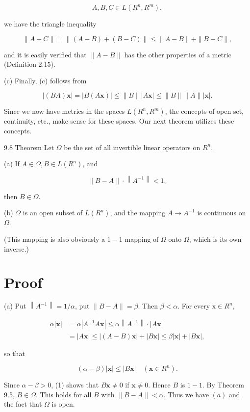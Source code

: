 \documentclass[10pt]{article}
\begin{document}
$$
A, B, C \in L\left(R^{n}, R^{m}\right),
$$

we have the triangle inequality

$$
\|A-C\|=\|(A-B)+(B-C)\| \leq\|A-B\|+\|B-C\|,
$$

and it is easily verified that $\|A-B\|$ has the other properties of a metric (Definition 2.15).

(c) Finally, (c) follows from

$$
|(B A) \mathbf{x}|=|B(A \mathbf{x})| \leq\|B\||A \mathbf{x}| \leq\|B\|\|A\||\mathbf{x}| .
$$

Since we now have metrics in the spaces $L\left(R^{n}, R^{m}\right)$, the concepts of open set, continuity, etc., make sense for these spaces. Our next theorem utilizes these concepts.

9.8 Theorem Let $\Omega$ be the set of all invertible linear operators on $R^{n}$.

(a) If $A \in \Omega, B \in L\left(R^{n}\right)$, and

$$
\|B-A\| \cdot\left\|A^{-1}\right\|<1,
$$

then $B \in \Omega$.

(b) $\Omega$ is an open subset of $L\left(R^{n}\right)$, and the mapping $A \rightarrow A^{-1}$ is continuous on $\Omega$.

(This mapping is also obviously a $1-1$ mapping of $\Omega$ onto $\Omega$, which is its own inverse.)

\section{Proof}
(a) Put $\left\|A^{-1}\right\|=1 / \alpha$, put $\|B-A\|=\beta$. Then $\beta<\alpha$. For every $\mathrm{x} \in R^{n}$,

$$
\begin{aligned}
\alpha|\mathbf{x}| & =\alpha\left|A^{-1} A \mathbf{x}\right| \leq \alpha\left\|A^{-1}\right\| \cdot|A \mathbf{x}| \\
& =|A \mathbf{x}| \leq|(A-B) \mathbf{x}|+|B \mathbf{x}| \leq \beta|\mathbf{x}|+|B \mathbf{x}|,
\end{aligned}
$$

so that

$$
(\alpha-\beta)|\mathbf{x}| \leq|B \mathbf{x}| \quad\left(\mathbf{x} \in R^{n}\right) .
$$

Since $\alpha-\beta>0$, (1) shows that $B \mathbf{x} \neq 0$ if $\mathbf{x} \neq 0$. Hence $B$ is $1-1$. By Theorem 9.5, $B \in \Omega$. This holds for all $B$ with $\|B-A\|<\alpha$. Thus we have $(a)$ and the fact that $\Omega$ is open.
\end{document}
